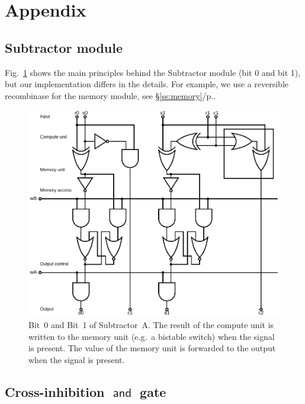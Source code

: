 \documentclass[12pt,notitlepage]{article}
\newcommand{\AND}{\ensuremath{\mathop{\mathsf{and}}}\xspace}
\begin{document}
\clearpage



\section*{Appendix}

\subsection{Subtractor module}

Fig.~\ref{f:logical-subtractor01} 
shows the main principles
behind 
the Subtractor module (bit 0 and bit 1),
but our implementation
differs in the details.
%
For example, we use a reversible recombinase
for the memory module, see \S\ref{ss:memory}/p.\pageref{ss:memory}.

\begin{figure}[phbt]
\centering
\includegraphics[width=0.9\linewidth]{circuits/Logical-HalfSubtractor0.svg.pdf}
\caption{%
Bit~0 and Bit~1
of
Subtractor~A.
%
The result of the compute unit is written to the memory unit
(e.g.~a bistable switch)
when the signal  is present.
%
The value of the memory unit is
forwarded to the output
when the signal  is present.
}
\label{f:logical-subtractor01}
\end{figure}




\subsection{Cross-inhibition \texorpdfstring{\AND}{AND} gate} \label{s:x-inh}
\end{document}
